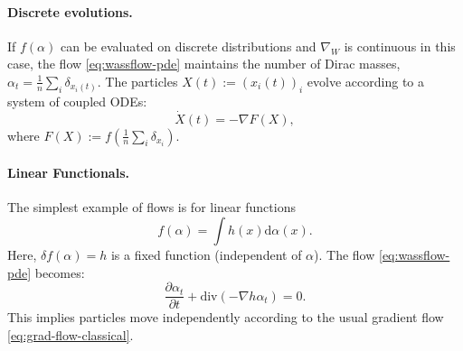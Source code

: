 \paragraph{Discrete evolutions.}

If $f(\alpha)$ can be evaluated on discrete distributions and $\nabla_W$ is continuous in this case, the flow \eqref{eq:wassflow-pde} maintains the number of Dirac masses, $\alpha_t = \frac{1}{n} \sum_i \delta_{x_i(t)}$. The particles $X(t) := (x_i(t))_i$ evolve according to a system of coupled ODEs:
\begin{equation}
    \dot{X}(t) = -\nabla F(X), \label{eq:wassflows-particles}
\end{equation}
where $F(X) := f\left(\frac{1}{n} \sum_i \delta_{x_i}\right)$.
 
\paragraph{Linear Functionals.} The simplest example of flows is for linear functions
   \begin{equation}
       f(\alpha) = \int h(x) \mathrm{d} \alpha(x). \label{eq:linear-func}
   \end{equation}
   Here, $\delta f(\alpha) = h$ is a fixed function (independent of $\alpha$). The flow \eqref{eq:wassflow-pde} becomes:
   \begin{equation}
       \frac{\partial \alpha_t}{\partial t} + \mathrm{div}(-\nabla h \alpha_t) = 0.
   \end{equation}
   This implies particles move independently according to the usual gradient flow \eqref{eq:grad-flow-classical}.

